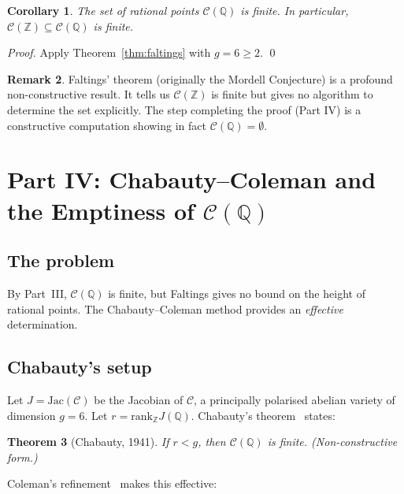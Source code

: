 \documentclass[12pt, a4paper]{article}
\newtheorem{theorem}{Theorem}[section]
\newtheorem{corollary}[theorem]{Corollary}
\theoremstyle{definition}
\newtheorem{remark}[theorem]{Remark}
\newcommand{\Z}{\mathbb{Z}}
\newcommand{\Q}{\mathbb{Q}}
\newcommand{\Jac}{\mathrm{Jac}}
\newcommand{\rank}{\mathrm{rank}}
\begin{document}
\begin{corollary}\label{cor:finite}
  The set of rational points $\mathcal{C}(\Q)$ is finite.
  In particular, $\mathcal{C}(\Z) \subseteq \mathcal{C}(\Q)$ is finite.
\end{corollary}

\begin{proof}
  Apply Theorem~\ref{thm:faltings} with $g = 6 \geq 2$. \qed
\end{proof}

\begin{remark}
  Faltings' theorem (originally the Mordell Conjecture) is a profound
  non-constructive result.  It tells us $\mathcal{C}(\Z)$ is finite but
  gives no algorithm to determine the set explicitly.  The step completing
  the proof (Part IV) is a constructive computation showing in fact
  $\mathcal{C}(\Q) = \emptyset$.
\end{remark}

\section{Part IV: Chabauty--Coleman and the Emptiness of $\mathcal{C}(\Q)$}
\label{sec:chabauty}

\subsection{The problem}

By Part~III, $\mathcal{C}(\Q)$ is finite, but Faltings gives no bound on the
height of rational points.  The Chabauty--Coleman method provides an \emph{effective}
determination.

\subsection{Chabauty's setup}

Let $J = \Jac(\mathcal{C})$ be the Jacobian of $\mathcal{C}$, a principally
polarised abelian variety of dimension $g = 6$.
Let $r = \rank_\Z J(\Q)$.  Chabauty's theorem~\cite{chabauty1941} states:

\begin{theorem}[Chabauty, 1941]
  If $r < g$, then $\mathcal{C}(\Q)$ is finite.  (Non-constructive form.)
\end{theorem}

Coleman's refinement~\cite{coleman1985} makes this effective:
\end{document}
